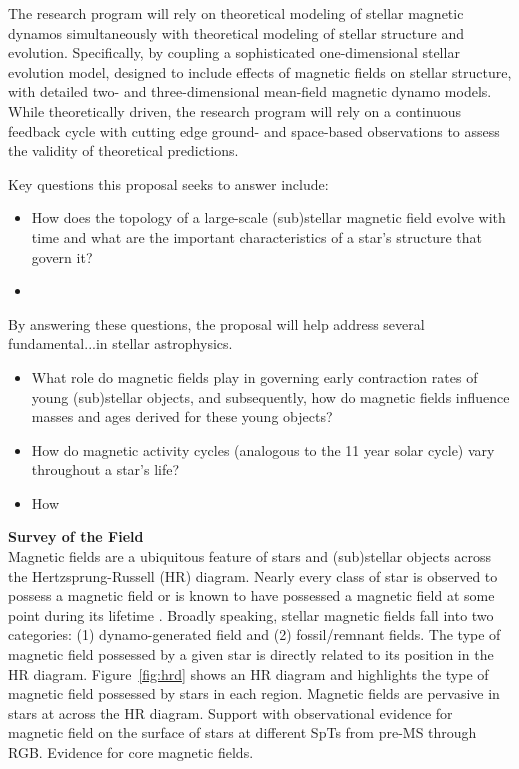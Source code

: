 \documentclass[12pt,a4paper]{article}
\begin{document}
The research program will rely on theoretical modeling of stellar magnetic dynamos simultaneously with theoretical modeling of stellar structure and evolution. Specifically, by coupling a sophisticated one-dimensional stellar evolution model, designed to include effects of magnetic fields on stellar structure, with detailed two- and three-dimensional mean-field magnetic dynamo models. While theoretically driven, the research program will rely on a continuous feedback cycle with cutting edge ground- and space-based observations to assess the validity of theoretical predictions.


Key questions this proposal seeks to answer include:
\begin{itemize}[leftmargin=0.25in]
	\item How does the topology of a large-scale (sub)stellar magnetic field evolve with time and what are the important characteristics of a star's structure that govern it?
	\item 
\end{itemize}

By answering these questions, the proposal will help address several fundamental...in stellar astrophysics.
\begin{itemize}[leftmargin=0.25in]
	\item What role do magnetic fields play in governing early contraction rates of young (sub)stellar objects, and subsequently, how do magnetic fields influence masses and ages derived for these young objects?
	\item How do magnetic activity cycles (analogous to the 11 year solar cycle) vary throughout a star's life?
	\item How  
\end{itemize}

\clearpage

{\bf \large Survey of the Field} \\
Magnetic fields are a ubiquitous feature of stars and (sub)stellar objects across the Hertzsprung-Russell (HR) diagram. Nearly every class of star is observed to possess a magnetic field or is known to have possessed a magnetic field at some point during its lifetime \citep{Donati2009}. 
Broadly speaking, stellar magnetic fields fall into two categories: (1) dynamo-generated field and (2) fossil/remnant fields. The type of magnetic field possessed by a given star is directly related to its position in the HR diagram. Figure~\ref{fig:hrd} shows an HR diagram and highlights the type of magnetic field possessed by stars in each region.
Magnetic fields are pervasive in stars at across the HR diagram. 
Support with observational evidence for magnetic field on the surface of stars at different SpTs from pre-MS through RGB. Evidence for core magnetic fields.
\end{document}
